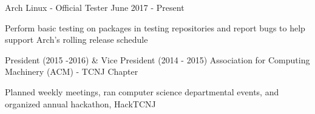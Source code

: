 
%
%

\begin{cventries}

  \bproject
    {Arch Linux - Official Tester}
    {June 2017 - Present} %
    {
      \begin{cvitems} %
        \item {Perform basic testing on packages in testing repositories and report bugs to help support Arch's rolling release schedule}
      \end{cvitems}
    }

  \cventry
  {President (2015 -2016) \& Vice President (2014 - 2015)} %
  {Association for Computing Machinery (ACM) - TCNJ Chapter} %
  {} %
  {} %
  {
    \begin{cvitems} %
    \item {Planned weekly meetings, ran computer science departmental events, and organized annual hackathon, HackTCNJ}
    \end{cvitems}
  }

\end{cventries}
